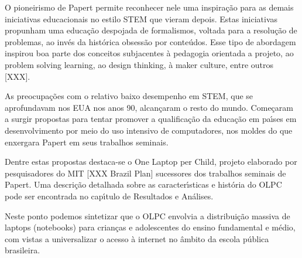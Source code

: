 \documentclass[
12pt,		%
openright,	%
twoside,  %
a4paper,			%
chapter=TITLE,		%
english,			%
french,				%
spanish,			%
brazil				%
]{USPSC-classe/USPSC}
\begin{document}
O pioneirismo de Papert permite reconhecer nele uma inspira\c{c}\~ao para as demais iniciativas educacionais no estilo STEM que vieram depois. Estas iniciativas propunham uma educa\c{c}\~ao despojada de formalismos, voltada para a resolu\c{c}\~ao de problemas, ao inv\'es da hist\'orica obsess\~ao por conte\'udos. Esse tipo de abordagem inspirou boa parte dos conceitos subjacentes \`a \textquotedbl pedagogia orientada a projeto\textquotedbl [XXX], ao \textquotedbl problem solving learning\textquotedbl [XXX], ao \textquotedbl design thinking, \`a \textquotedbl maker culture\textquotedbl , entre outros [XXX].














As preocupa\c{c}\~oes com o relativo baixo desempenho em STEM, que se aprofundavam nos EUA nos anos 90, alcan\c{c}aram o resto do mundo. Come\c{c}aram a surgir propostas para tentar promover a qualifica\c{c}\~ao da educa\c{c}\~ao em pa\'{\i}ses em desenvolvimento por meio do uso intensivo de computadores, nos moldes do que enxergara Papert em seus trabalhos seminais.














Dentre estas propostas destaca-se o \textquotedbl One Laptop per Child\textquotedbl , projeto elaborado por pesquisadores do MIT [XXX Brazil Plan] sucessores dos trabalhos seminais de Papert. Uma descri\c{c}\~ao detalhada sobre as caracter\'{\i}sticas e hist\'oria do OLPC pode ser encontrada no cap\'{\i}tulo de Resultados e An\'alises.














Neste ponto podemos sintetizar que o OLPC envolvia a distribui\c{c}\~ao massiva de laptops (notebooks) para crian\c{c}as e adolescentes do  ensino fundamental e m\'edio, com vistas a universalizar o acesso \`a internet no \^ambito da escola p\'ublica brasileira.
\end{document}
